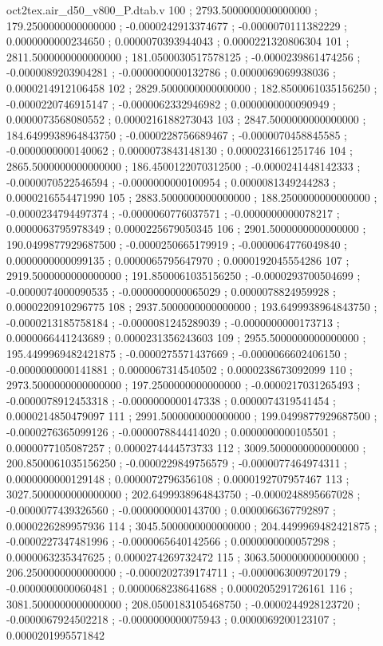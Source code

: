 \begin{filecontents}[overwrite]{oct2tex.air_d50_v800_P.dtab.v}
100 ; 2793.5000000000000000 ; 179.2500000000000000 ; -0.0000242913374677 ; -0.0000070111382229 ; 0.0000000000234650 ; 0.0000070393944043 ; 0.0000221320806304
101 ; 2811.5000000000000000 ; 181.0500030517578125 ; -0.0000239861474256 ; -0.0000089203904281 ; -0.0000000000132786 ; 0.0000069069938036 ; 0.0000214912106458
102 ; 2829.5000000000000000 ; 182.8500061035156250 ; -0.0000220746915147 ; -0.0000062332946982 ; 0.0000000000090949 ; 0.0000073568080552 ; 0.0000216188273043
103 ; 2847.5000000000000000 ; 184.6499938964843750 ; -0.0000228756689467 ; -0.0000070458845585 ; -0.0000000000140062 ; 0.0000073843148130 ; 0.0000231661251746
104 ; 2865.5000000000000000 ; 186.4500122070312500 ; -0.0000241448142333 ; -0.0000070522546594 ; -0.0000000000100954 ; 0.0000081349244283 ; 0.0000216554471990
105 ; 2883.5000000000000000 ; 188.2500000000000000 ; -0.0000234794497374 ; -0.0000060776037571 ; -0.0000000000078217 ; 0.0000063795978349 ; 0.0000225679050345
106 ; 2901.5000000000000000 ; 190.0499877929687500 ; -0.0000250665179919 ; -0.0000064776049840 ; 0.0000000000099135 ; 0.0000065795647970 ; 0.0000192045554286
107 ; 2919.5000000000000000 ; 191.8500061035156250 ; -0.0000293700504699 ; -0.0000074000090535 ; -0.0000000000065029 ; 0.0000078824959928 ; 0.0000220910296775
108 ; 2937.5000000000000000 ; 193.6499938964843750 ; -0.0000213185758184 ; -0.0000081245289039 ; -0.0000000000173713 ; 0.0000066441243689 ; 0.0000231356243603
109 ; 2955.5000000000000000 ; 195.4499969482421875 ; -0.0000275571437669 ; -0.0000066602406150 ; -0.0000000000141881 ; 0.0000067314540502 ; 0.0000238673092099
110 ; 2973.5000000000000000 ; 197.2500000000000000 ; -0.0000217031265493 ; -0.0000078912453318 ; -0.0000000000147338 ; 0.0000074319541454 ; 0.0000214850479097
111 ; 2991.5000000000000000 ; 199.0499877929687500 ; -0.0000276365099126 ; -0.0000078844414020 ; 0.0000000000105501 ; 0.0000077105087257 ; 0.0000274444573733
112 ; 3009.5000000000000000 ; 200.8500061035156250 ; -0.0000229849756579 ; -0.0000077464974311 ; 0.0000000000129148 ; 0.0000072796356108 ; 0.0000192707957467
113 ; 3027.5000000000000000 ; 202.6499938964843750 ; -0.0000248895667028 ; -0.0000077439326560 ; -0.0000000000143700 ; 0.0000066367792897 ; 0.0000226289957936
114 ; 3045.5000000000000000 ; 204.4499969482421875 ; -0.0000227347481996 ; -0.0000065640142566 ; 0.0000000000057298 ; 0.0000063235347625 ; 0.0000274269732472
115 ; 3063.5000000000000000 ; 206.2500000000000000 ; -0.0000202739174711 ; -0.0000063009720179 ; -0.0000000000060481 ; 0.0000068238641688 ; 0.0000205291726161
116 ; 3081.5000000000000000 ; 208.0500183105468750 ; -0.0000244928123720 ; -0.0000067924502218 ; -0.0000000000075943 ; 0.0000069200123107 ; 0.0000201995571842

\end{filecontents}
